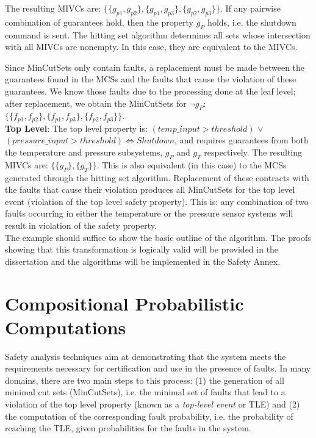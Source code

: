 The resulting MIVCs are: $\{\{g_{p1}, g_{p2}\}, \{g_{p1}, g_{p3}\}, \{g_{p2}, g_{p3}\}\}$. If any pairwise combination of guarantees hold, then the property $g_P$ holds, i.e. the shutdown command is sent. The hitting set algorithm determines all sets whose intersection with all MIVCs are nonempty. In this case, they are equivalent to the MIVCs. 

Since MinCutSets only contain faults, a replacement must be made between the guarantees found in the MCSs and the faults that cause the violation of these guarantees. We know those faults due to the processing done at the leaf level; after replacement, we obtain the MinCutSets for $\neg g_P$: $\{\{f_{p1}, f_{p2}\}, \{f_{p1}, f_{p3}\}, \{f_{p2}, f_{p3}\}\}$.\\

\textbf{Top Level}: The top level property is: $(temp\_input > threshold)$ $\lor$ $(pressure\_input > threshold) \iff Shutdown$, and requires guarantees from both the temperature and pressure subsystems, $g_P$ and $g_T$ respectively. The resulting MIVCs are: $\{\{g_P\}, \{g_T\}\}$. This is also equivalent (in this case) to the MCSs generated through the hitting set algorithm. Replacement of these contracts with the faults that cause their violation produces all MinCutSets for the top level event (violation of the top level safety property). This is: any combination of two faults occurring in either the temperature or the pressure sensor systems will result in violation of the safety property. \\

The example should suffice to show the basic outline of the algorithm. The proofs showing that this transformation is logically valid will be provided in the dissertation and the algorithms will be implemented in the Safety Annex.  


\section{Compositional Probabilistic Computations}
Safety analysis techniques aim at demonstrating that the system meets the requirements necessary for certification and use in the presence of faults. In many domains, there are two main steps to this process: (1) the generation of all minimal cut sets (MinCutSets), i.e. the minimal set of faults that lead to a violation of the top level property (known as a \textit{top-level event} or TLE) and (2) the computation of the corresponding fault probability, i.e. the probability of reaching the TLE, given probabilities for the faults in the system. 

